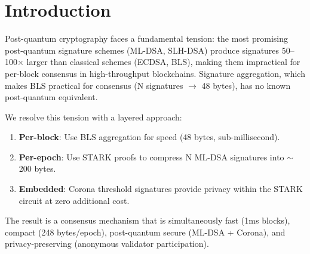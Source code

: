 \section{Introduction}


Post-quantum cryptography faces a fundamental tension: the most promising post-quantum signature schemes (ML-DSA, SLH-DSA) produce signatures 50--100$\times$ larger than classical schemes (ECDSA, BLS), making them impractical for per-block consensus in high-throughput blockchains. Signature aggregation, which makes BLS practical for consensus (N signatures $\to$ 48 bytes), has no known post-quantum equivalent.

We resolve this tension with a layered approach:

\begin{enumerate}[leftmargin=2em]
\item \textbf{Per-block}: Use BLS aggregation for speed (48 bytes, sub-millisecond).
\item \textbf{Per-epoch}: Use STARK proofs to compress N ML-DSA signatures into $\sim$200 bytes.
\item \textbf{Embedded}: Corona threshold signatures provide privacy within the STARK circuit at zero additional cost.
\end{enumerate}

The result is a consensus mechanism that is simultaneously fast (1ms blocks), compact (248 bytes/epoch), post-quantum secure (ML-DSA + Corona), and privacy-preserving (anonymous validator participation).

